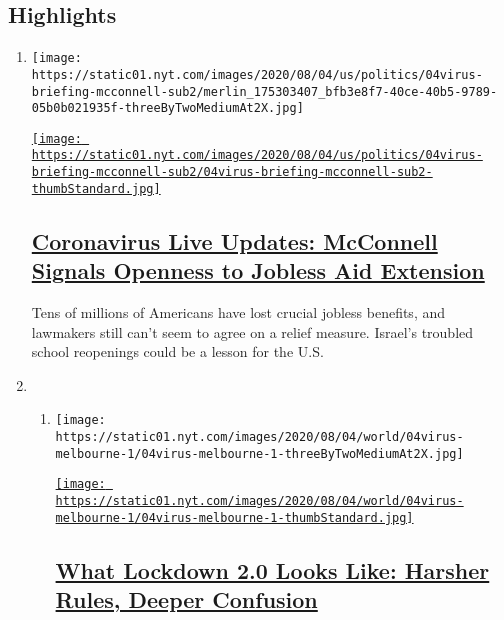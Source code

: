 \hypertarget{highlights}{%
\subsection{Highlights}\label{highlights}}

\begin{enumerate}
\def\labelenumi{\arabic{enumi}.}
\item
  \texttt{[image: https://static01.nyt.com/images/2020/08/04/us/politics/04virus-briefing-mcconnell-sub2/merlin\_175303407\_bfb3e8f7-40ce-40b5-9789-05b0b021935f-threeByTwoMediumAt2X.jpg]}

  \href{/2020/08/04/world/coronavirus-cases.html}{\texttt{[image: https://static01.nyt.com/images/2020/08/04/us/politics/04virus-briefing-mcconnell-sub2/04virus-briefing-mcconnell-sub2-thumbStandard.jpg]}}

  \hypertarget{coronavirus-live-updates-mcconnell-signals-openness-to-jobless-aid-extension}{%
  \subsection{\texorpdfstring{\href{/2020/08/04/world/coronavirus-cases.html}{Coronavirus
  Live Updates: McConnell Signals Openness to Jobless Aid
  Extension}}{Coronavirus Live Updates: McConnell Signals Openness to Jobless Aid Extension}}\label{coronavirus-live-updates-mcconnell-signals-openness-to-jobless-aid-extension}}

  Tens of millions of Americans have lost crucial jobless benefits, and
  lawmakers still can't seem to agree on a relief measure. Israel's
  troubled school reopenings could be a lesson for the U.S.
\item
  \begin{enumerate}
  \def\labelenumii{\arabic{enumii}.}
  \item
    \texttt{[image: https://static01.nyt.com/images/2020/08/04/world/04virus-melbourne-1/04virus-melbourne-1-threeByTwoMediumAt2X.jpg]}

    \href{/2020/08/04/world/australia/coronavirus-melbourne-lockdown.html}{\texttt{[image: https://static01.nyt.com/images/2020/08/04/world/04virus-melbourne-1/04virus-melbourne-1-thumbStandard.jpg]}}

    \hypertarget{what-lockdown-20-looks-like-harsher-rules-deeper-confusion}{%
    \subsection{\texorpdfstring{\href{/2020/08/04/world/australia/coronavirus-melbourne-lockdown.html}{What
    Lockdown 2.0 Looks Like: Harsher Rules, Deeper
    Confusion}}{What Lockdown 2.0 Looks Like: Harsher Rules, Deeper Confusion}}\label{what-lockdown-20-looks-like-harsher-rules-deeper-confusion}}


\end{enumerate}
\end{enumerate}
